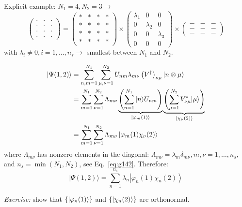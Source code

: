 \documentclass[12pt]{article}
\newcommand{\be}{\begin{equation}}
\newcommand{\ee}{\end{equation}}
\begin{document}
Explicit example: $N_1 = 4, N_2 = 3 \rightarrow$
\be
\begin{pmatrix}
\cdot & \cdot & \cdot\\
\cdot & \cdot & \cdot\\
\cdot & \cdot & \cdot\\
\cdot & \cdot & \cdot
\end{pmatrix} =
\begin{pmatrix}
* & * & * & *\\
* & * & * & *\\
* & * & * & *\\
* & * & * & *
\end{pmatrix}\times
\begin{pmatrix}
\lambda_1 & 0 & 0 \\
0 & \lambda_2 & 0 \\
0 & 0 & \lambda_3 \\
0 & 0 & 0
\end{pmatrix}\times
\begin{pmatrix}
- & - & -\\
- & - & -\\
- & - & -
\end{pmatrix}
\label{eq:g142}
\ee
with $\lambda_i \neq 0, i=1,\ldots, n_s \rightarrow$ smallest between $N_1$ and $N_2$. 

\be
\begin{aligned}
|\Psi(1,2)\rangle
&=\sum_{n, m=1}^{N_{1}} \sum_{\mu,\nu=1}^{N_{2}} U_{n m} \lambda_{m \nu}\left(V^{\dagger}\right)_{\nu \mu} | n \otimes \mu\rangle\\
&=\sum_{m=1}^{N_{1}} \sum_{\nu=1}^{N_{2}} \Lambda_{m \nu}
\underbrace{\left(\sum_{n=1}^{N_{1}}|n\rangle U_{n m}\right)}%
_{\ket{\varphi_m(1)}}
\underbrace{\left(\sum_{\mu=1}^{N_{2}} V_{\nu \mu}^{*}|\mu\rangle\right)}%
_{\ket{\chi_\nu(2)}}\\
&=\sum_{m=1}^{N_{1}} \sum_{\nu=1}^{N_{2}} \Lambda_{m \nu} \left|\varphi_{m}(1) \chi_{\nu}(2)\right\rangle
\end{aligned}
\ee
where $\Lambda_{m \nu}$ has nonzero elements in the diagonal:
$\Lambda_{m \nu} = \lambda_{m}\delta_{m \nu}, m,\nu=1,\ldots,n_s$,
and $n_s = \min(N_1,N_2)$, see Eq.~\eqref{eq:g142}.
Therefore:
\be
\boxed{
|\Psi(1,2)\rangle=\sum_{n=1}^{n_{s}} \lambda_{n}\left|\varphi_{n}(1) \chi_{n}(2)\right\rangle
}
\ee

\emph{Exercise:} show that $\{\ket{\varphi_{n}(1)}\}$ and $\{\ket{\chi_{n}(2)}\}$ are orthonormal.

\end{document}

